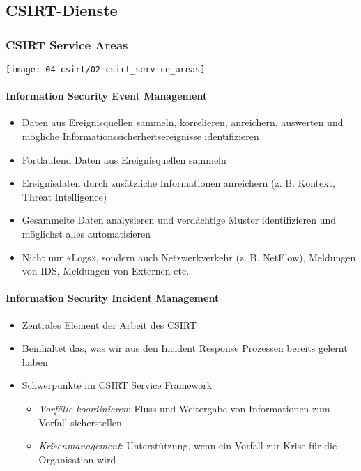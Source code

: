 \subsection{CSIRT-Dienste}

\subsubsection{CSIRT Service Areas}
\begin{center}
    \texttt{[image: 04-csirt/02-csirt\_service\_areas]}
\end{center}

\paragraph{Information Security Event Management}
\begin{itemize}
    \item Daten aus Ereignisquellen sammeln, korrelieren, anreichern, auswerten und mögliche Informationssicherheitsereignisse identifizieren
    \item Fortlaufend Daten aus Ereignisquellen sammeln
    \item Ereignisdaten durch zusätzliche Informationen anreichern (z. B. Kontext, Threat Intelligence)
    \item Gesammelte Daten analysieren und verdächtige Muster identifizieren und möglichst alles automatisieren
    \item Nicht nur «Logs», sondern auch Netzwerkverkehr (z. B. NetFlow), Meldungen von IDS, Meldungen von Externen etc.
\end{itemize}

\paragraph{Information Security Incident Management}
\begin{itemize}
    \item Zentrales Element der Arbeit des CSIRT
    \item Beinhaltet das, was wir aus den Incident Response Prozessen bereits gelernt haben
    \item Schwerpunkte im CSIRT Service Framework
    \begin{itemize}
        \item \textit{Vorfälle koordinieren}: Fluss und Weitergabe von Informationen zum Vorfall sicherstellen
        \item \textit{Krisenmanagement}: Unterstützung, wenn ein Vorfall zur Krise für die Organisation wird
    \end{itemize}
\end{itemize}

